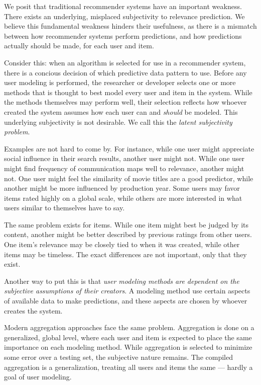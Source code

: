 We posit that traditional recommender systems have an important weakness.
There exists an underlying, misplaced subjectivity to relevance prediction.
We believe this fundamental weakness hinders their usefulness,
as there is a mismatch between how recommender systems perform predictions,
and how predictions actually should be made, for each user and item.



Consider this: 
when an algorithm is selected for use in a recommender system,
there is a concious decision of which predictive data pattern to use.
Before any user modeling is performed, the researcher or developer selects
one or more methods that is thought to best model every user and item in the system.
While the methods themselves may perform well, their selection
reflects how whoever created the system assumes how each user
can and \emph{should} be modeled. This underlying subjectivity is not desirable.
We call this the \emph{latent subjectivity problem}.

Examples are not hard to come by.
For instance, while one user might appreciate social
influence in their search results, another user might not.
While one user might find frequency of communication maps well to relevance,
another might not. 
One user might feel the similarity of movie titles are a good predictor,
while another might be more influenced by production year.
Some users may favor items rated highly on a global scale,
while others are more interested in what users similar to themselves have to say.

The same problem exists for items. While one item might best be judged by its content,
another might be better described by previous ratings from other users.
One item's relevance may be closely tied to when it was created,
while other items may be timeless.
The exact differences are not important, only that they exist.

Another way to put this is that 
\emph{user modeling methods are dependent on the subjective assumptions of their creators}.
A modeling method use certain aspects of available data to make predictions,
and these aspects are chosen by whoever creates the system.

Modern aggregation approaches face the same problem. 
Aggregation is done on a generalized, global level,
where each user and item is expected to place the same importance on each modeling method.
While aggregation is selected to minimize some error over a testing set,
the subjective nature remains. The compiled aggregation is a generalization,
treating all users and items the same --- hardly a goal of user modeling.

